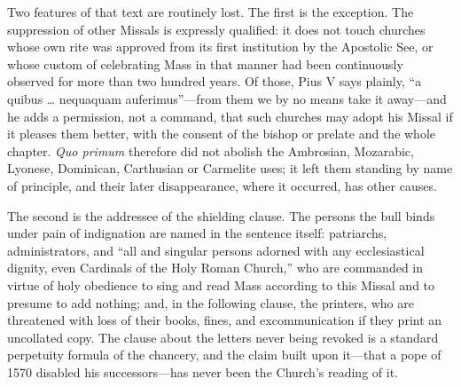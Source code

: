 Two features of that text are routinely lost. The first is the exception. The suppression of other Missals is expressly qualified: it does not touch churches whose own rite was approved from its first institution by the Apostolic See, or whose custom of celebrating Mass in that manner had been continuously observed for more than two hundred years. Of those, Pius V says plainly, ``a quibus \dots{} nequaquam auferimus''---from them we by no means take it away---and he adds a permission, not a command, that such churches may adopt his Missal if it pleases them better, with the consent of the bishop or prelate and the whole chapter. \emph{Quo primum} therefore did not abolish the Ambrosian, Mozarabic, Lyonese, Dominican, Carthusian or Carmelite uses; it left them standing by name of principle, and their later disappearance, where it occurred, has other causes.

The second is the addressee of the shielding clause. The persons the bull binds under pain of indignation are named in the sentence itself: patriarchs, administrators, and ``all and singular persons adorned with any ecclesiastical dignity, even Cardinals of the Holy Roman Church,'' who are commanded in virtue of holy obedience to sing and read Mass according to this Missal and to presume to add nothing; and, in the following clause, the printers, who are threatened with loss of their books, fines, and excommunication if they print an uncollated copy. The clause about the letters never being revoked is a standard perpetuity formula of the chancery, and the claim built upon it---that a pope of 1570 disabled his successors---has never been the Church's reading of it.

